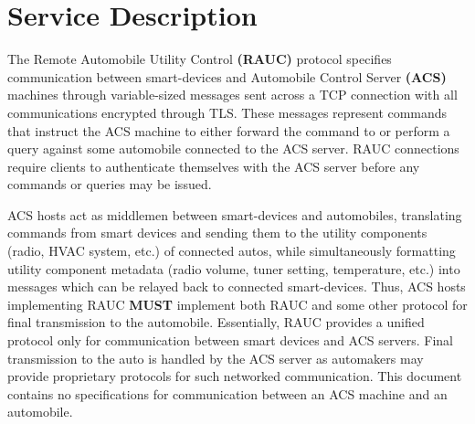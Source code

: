 
\section{Service Description}
\label{sec:serv_desc}

The Remote Automobile Utility Control \textbf{(RAUC)} protocol specifies communication between smart-devices and Automobile Control Server \textbf{(ACS)} machines through variable-sized messages sent across a TCP connection with all communications encrypted through TLS. These messages represent commands that instruct the ACS machine to either forward the command to or perform a query against some automobile connected to the ACS server. RAUC connections require clients to authenticate themselves with the ACS server before any commands or queries may be issued.
\par
ACS hosts act as middlemen between smart-devices and automobiles, translating commands from smart devices and sending them to the utility components (radio, HVAC system, etc.) of connected autos, while simultaneously formatting utility component metadata (radio volume, tuner setting, temperature, etc.) into messages which can be relayed back to connected smart-devices. Thus, ACS hosts implementing RAUC \textbf{MUST} implement both RAUC and some other protocol for final transmission to the automobile. Essentially, RAUC provides a unified protocol only for communication between smart devices and ACS servers. Final transmission to the auto is handled by the ACS server as automakers may provide proprietary protocols for such networked communication. This document contains no specifications for communication between an ACS machine and an automobile.
